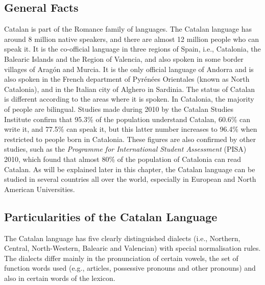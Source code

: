 \clearpage


\begin{multicols}{2}

\subsection{General Facts}

    Catalan is part of the Romance family of languages. The Catalan language has around 8 million native speakers, and there are almost 12 million people who can speak it. It is the co-official language in three regions of Spain, i.e., Catalonia, the Balearic Islands and the Region of Valencia, and also spoken in some border villages of Aragón and Murcia.  It is the only official language of Andorra and is also spoken in the French department of Pyrénées Orientales (known as North Catalonia), and in the Italian city of Alghero in Sardinia.
The status of Catalan is different according to the areas where it is spoken. In Catalonia, the majority of people are bilingual. Studies made during 2010 by the Catalan Studies Institute confirm that 95.3\% of the population understand Catalan, 60.6\% can write it, and 77.5\% can speak it, but this latter number increases to 96.4\% when restricted to people born in Catalonia. These figures are also confirmed by other studies, such as the \textit{Programme for International Student Assessment} (PISA)  2010, which found that almost 80\% of the population of Catalonia can read Catalan. 
As will be explained later in this chapter, the Catalan language can be studied in several countries all over the world, especially in European and North American Universities.


\subsection{Particularities of the Catalan Language}

The Catalan language has five clearly distinguished dialects (i.e., Northern, Central, North-Western, Balearic and Valencian) with special normalisation rules. The dialects differ mainly in the pronunciation of certain vowels, the set of function words used (e.g., articles, possessive pronouns and other pronouns) and also in certain words of the lexicon. 


\end{multicols}
